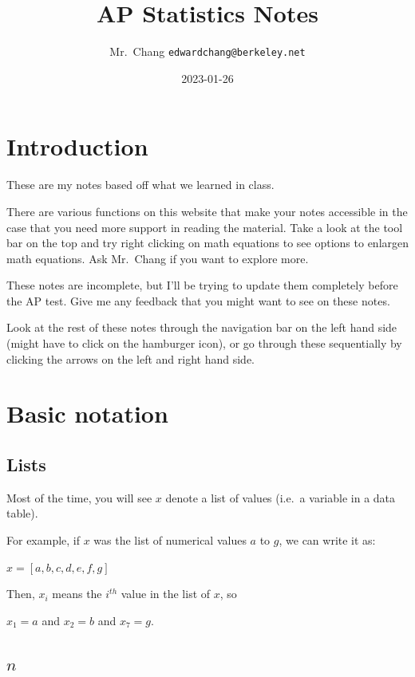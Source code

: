 \documentclass[
]{book}
\title{AP Statistics Notes}
\author{Mr.~Chang \texttt{edwardchang@berkeley.net}}
\date{2023-01-26}
\begin{document}
\maketitle

{
\setcounter{tocdepth}{1}
\tableofcontents
}
\hypertarget{introduction}{%
\chapter{Introduction}\label{introduction}}

These are my notes based off what we learned in class.

There are various functions on this website that make your notes accessible in the case that you need more support in reading the material. Take a look at the tool bar on the top and try right clicking on math equations to see options to enlargen math equations. Ask Mr.~Chang if you want to explore more.

These notes are incomplete, but I'll be trying to update them completely before the AP test. Give me any feedback that you might want to see on these notes.

Look at the rest of these notes through the navigation bar on the left hand side (might have to click on the hamburger icon), or go through these sequentially by clicking the arrows on the left and right hand side.

\hypertarget{basic-notation}{%
\chapter{Basic notation}\label{basic-notation}}

\hypertarget{lists}{%
\section{Lists}\label{lists}}

Most of the time, you will see \(x\) denote a list of values (i.e.~a
variable in a data table).

For example, if \(x\) was the list of numerical values \(a\) to \(g\), we can
write it as:

\(x = [a, b, c, d, e, f, g]\)

Then, \(x_i\) means the \(i^{th}\) value in the list of \(x\), so

\(x_1 = a\) and \(x_2 = b\) and \(x_7 = g\).

\hypertarget{n}{%
\section{\texorpdfstring{\(n\)}{n}}\label{n}}
\end{document}
